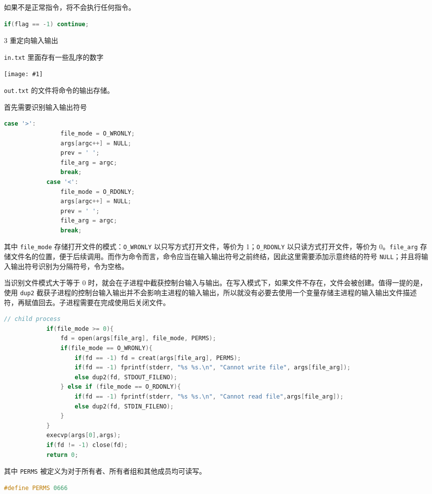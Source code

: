 \documentclass[12pt,a4paper]{article}
\newenvironment{problems}{\begin{list}{}{\renewcommand{\makelabel}[1]{\textbf{##1}\hfil}}}{\end{list}}
\newenvironment{steps}{\begin{list}{}{\renewcommand{\makelabel}[1]{##1.\hfil}}}{\end{list}}
\providecommand{\code}[2]{}
\providecommand{\img}[1]{\texttt{[image: \#1]}}
\begin{document}
\begin{problems}
\begin{steps}
        如果不是正常指令，将不会执行任何指令。
        \begin{lstlisting}[language=c]
            if(flag == -1) continue;
        \end{lstlisting}

        \item[3] 重定向输入输出
        
        \verb"in.txt" 里面存有一些乱序的数字
        \code{src/in.txt}{}

        \img{redir.png}

        \verb"out.txt" 的文件将命令的输出存储。
        \code{src/out.txt}{}

        首先需要识别输入输出符号
        \begin{lstlisting}[language=c]
            case '>':
                file_mode = O_WRONLY;
                args[argc++] = NULL;
                prev = ' ';
                file_arg = argc;
                break;
            case '<':
                file_mode = O_RDONLY;
                args[argc++] = NULL;
                prev = ' ';
                file_arg = argc;
                break;
        \end{lstlisting}
        其中 \verb"file_mode" 存储打开文件的模式：\verb"O_WRONLY" 以只写方式打开文件，等价为 1；\verb"O_RDONLY" 以只读方式打开文件，等价为 0。\verb"file_arg" 存储文件名的位置，便于后续调用。而作为命令而言，命令应当在输入输出符号之前终结，因此这里需要添加示意终结的符号 \verb"NULL"；并且将输入输出符号识别为分隔符号，令为空格。

        当识别文件模式大于等于 0 时，就会在子进程中截获控制台输入与输出。在写入模式下，如果文件不存在，文件会被创建。值得一提的是，使用 \verb"dup2" 截获子进程的控制台输入输出并不会影响主进程的输入输出，所以就没有必要去使用一个变量存储主进程的输入输出文件描述符，再赋值回去。子进程需要在完成使用后关闭文件。
        \begin{lstlisting}[language=c]
            // child process
            if(file_mode >= 0){
                fd = open(args[file_arg], file_mode, PERMS);
                if(file_mode == O_WRONLY){
                    if(fd == -1) fd = creat(args[file_arg], PERMS);
                    if(fd == -1) fprintf(stderr, "%s %s.\n", "Cannot write file", args[file_arg]);
                    else dup2(fd, STDOUT_FILENO);
                } else if (file_mode == O_RDONLY){
                    if(fd == -1) fprintf(stderr, "%s %s.\n", "Cannot read file",args[file_arg]);
                    else dup2(fd, STDIN_FILENO);
                }
            }
            execvp(args[0],args);
            if(fd != -1) close(fd);
            return 0;
        \end{lstlisting}
        其中 \verb"PERMS" 被定义为对于所有者、所有者组和其他成员均可读写。
        \begin{lstlisting}[language=c]
            #define PERMS 0666
        \end{lstlisting}


\end{steps}
\end{problems}
\end{document}
